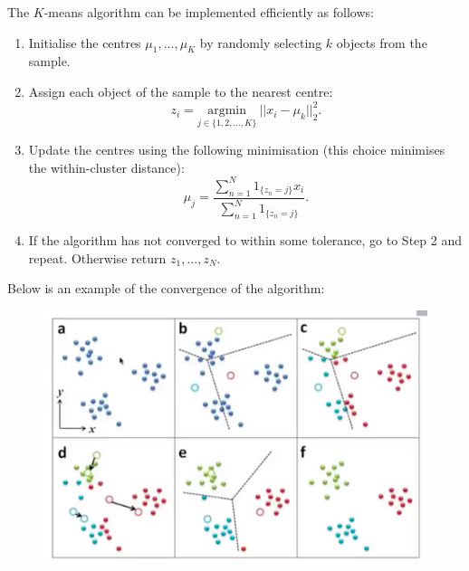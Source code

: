 The $K$-means algorithm can be implemented efficiently as follows:
\begin{enumerate}[label = (\arabic*)]
\item Initialise the centres $\mu_1,...,\mu_K$ by randomly selecting $k$ objects from the sample.
\item Assign each object of the sample to the nearest centre:
\begin{equation*}
z_i = \underset{j \in \{1,2,...,K\}}{\textrm{argmin}}\ ||x_i - \mu_k||_2^2.
\end{equation*}
\item Update the centres using the following minimisation (this choice minimises the within-cluster distance):
\begin{equation*}
\mu_j = \frac{\displaystyle \sum_{n=1}^{N} 1_{\{z_n = j\}} x_i}{\displaystyle \sum_{n=1}^{N} 1_{\{z_n = j\}}}.
\end{equation*}
\item If the algorithm has not converged to within some tolerance, go to Step 2 and repeat. Otherwise return $z_1,...,z_N$. 
\end{enumerate}
Below is an example of the convergence of the algorithm:
\begin{figure}[H]
\centering
\includegraphics[scale=0.4]{kmeansconvergence.png}
\end{figure}

